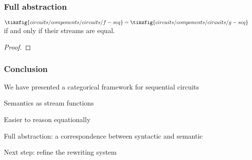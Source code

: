 \begin{frame}
    \frametitle{Full abstraction}

    \begin{theorem}[]
        \(
            \tikzfig{circuits/components/circuits/f-seq} = \tikzfig{circuits/components/circuits/g-seq}
        \)
        if and only if their streams are equal.
    \end{theorem}
    \begin{proof}
    \end{proof}
\end{frame}

\begin{frame}
    \frametitle{Conclusion}

    We have presented a \alert{categorical framework} for sequential circuits

    \wait

    Semantics as \alert{stream functions}
    
    \wait

    Easier to reason \alert{equationally}

    \wait

    \alert{Full abstraction}: a correspondence between syntactic and semantic

    \wait

    Next step: refine the \alert{rewriting system}

\end{frame}